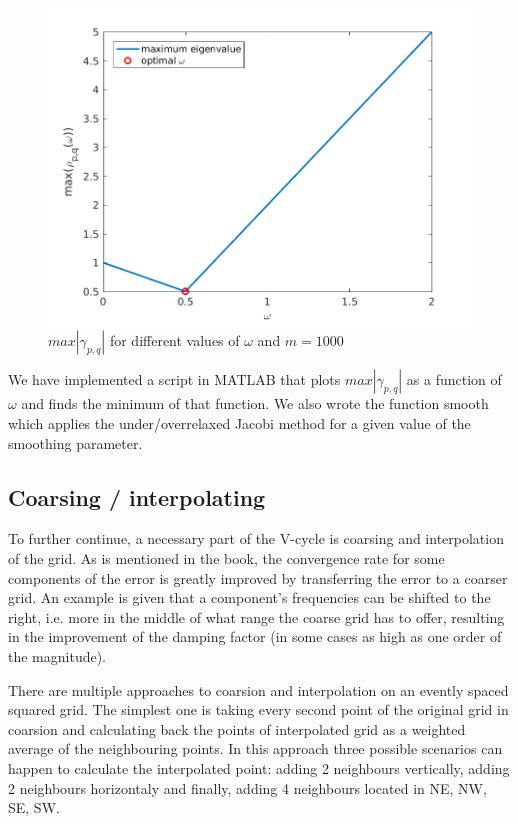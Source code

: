 \documentclass[main.tex]{subfiles}
\begin{document}
\begin{figure}[h]
    \centering
    \includegraphics[width=\textwidth]{../Figures/omegaopt}
    \caption{$max |\gamma_{p,q}|$ for different values of $\omega$ and $m = 1000$}
    \label{fig:omegaopt}
\end{figure}

We have implemented a script in MATLAB that plots $max |\gamma_{p,q}|$ as a function of $\omega$ and finds the minimum of that function. We also wrote the function smooth which applies the under/overrelaxed Jacobi method for a given value of the smoothing parameter.

\subsection{Coarsing / interpolating}
To further continue, a necessary part of the V-cycle is coarsing and interpolation of the grid. As is mentioned in the book, the convergence rate for some components of the error is greatly improved by transferring the error to a coarser grid. An example is given that a component's frequencies can be shifted to the right, i.e. more in the middle of what range the coarse grid has to offer, resulting in the improvement of the damping factor (in some cases as high as one order of the magnitude).

There are multiple approaches to coarsion and interpolation on an evently spaced squared grid. The simplest one is taking every second point of the original grid in coarsion and calculating back the points of interpolated grid as a weighted average of the neighbouring points. In this approach three possible scenarios can happen to calculate the interpolated point: adding 2 neighbours vertically, adding 2 neighbours horizontaly and finally, adding 4 neighbours located in NE, NW, SE, SW.
\end{document}

